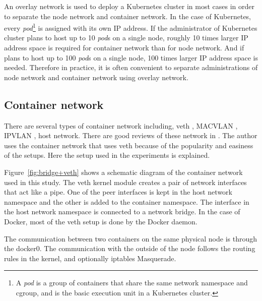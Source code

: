  An overlay network is used to deploy a Kubernetes cluster in most cases in order to separate the node network and container network.
  In the case of Kubernetes, every {\em pod}\footnote{A {\em pod} is a group of containers that share the same network namespace and cgroup, and is the basic execution unit in a Kubernetes cluster.} is assigned with its own IP address.
  If the administrator of Kubernetes cluster plans to host up to 10 {\em pod}s on a single node, roughly 10 times larger IP address space is required for container network than for node network.
  And if  plans to host up to 100 {\em pod}s on a single node, 100 times larger IP address space is needed. 
  Therefore in practice, it is often convenient to separate administrations of node network and container network using overlay network.


\subsection{Container network}

There are several types of container network including, veth \cite{bhattiprolu2008virtual}, MACVLAN \cite{rathore2010performance}, IPVLAN \cite{ipvlan}, host network.
There are good reviews of these network in  \cite{Marmol2015,claassen2016linux,struye2017assessing}.
The author uses the container network that uses  veth because of the popularity and easiness of the setups.
Here the setup used in the experiments is explained.

Figure~\ref{fig:bridge+veth} shows a schematic diagram of the container network used in this study.
The veth kernel module creates a pair of network interfaces that act like a pipe.
One of the peer interfaces is kept in the host network namespace and the other is added to the container namespace.
The interface in the host network namespace is connected to a network bridge.
In the case of Docker, most of the veth setup is done by the Docker daemon.

The communication between two containers on the same physical node is through the docker0.
The communication with the outside of the node  follows the routing rules in the kernel,
and optionally  iptables Masquerade.  

